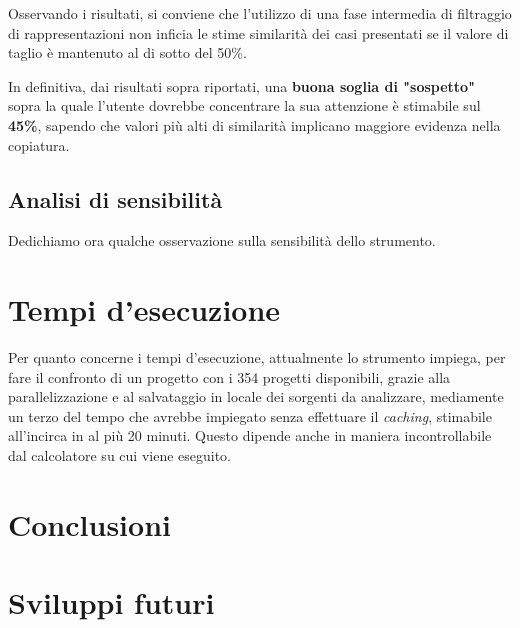 Osservando i risultati, si conviene che l'utilizzo di una fase intermedia di filtraggio di rappresentazioni non inficia le stime similarità dei casi presentati se il valore di taglio è mantenuto al di sotto del 50\%.

\vspace*{0.3cm}

In definitiva, dai risultati sopra riportati, una \textbf{buona soglia di "sospetto"} sopra la quale l'utente dovrebbe concentrare la sua attenzione è stimabile sul \textbf{45\%}, sapendo che valori più alti di similarità implicano maggiore evidenza nella copiatura.

\subsection{Analisi di sensibilità}
Dedichiamo ora qualche osservazione sulla sensibilità dello strumento.



\section{Tempi d'esecuzione}
Per quanto concerne i tempi d'esecuzione, attualmente lo strumento impiega, per fare il confronto di un progetto con i 354 progetti disponibili, grazie alla parallelizzazione e al salvataggio in locale dei sorgenti da analizzare, mediamente un terzo del tempo che avrebbe impiegato senza effettuare il \textit{caching}, stimabile all'incirca in al più 20 minuti.
%
Questo dipende anche in maniera incontrollabile dal calcolatore su cui viene eseguito.

\section{Conclusioni}

\section{Sviluppi futuri}
